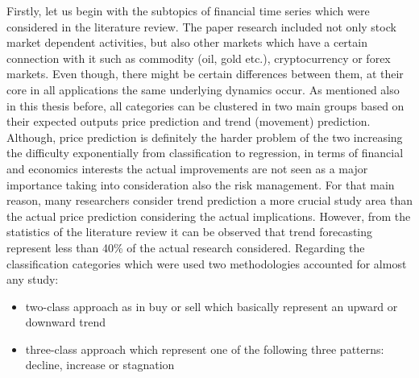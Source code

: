 Firstly, let us begin with the subtopics of financial time series which were considered in the literature review. The paper research included not only stock market dependent activities, but also other markets which have a certain connection with it such as commodity (oil, gold etc.), cryptocurrency or forex markets. Even though, there might be certain differences between them, at their core in all applications the same underlying dynamics occur. As mentioned also in this thesis before, all categories can be clustered in two main groups based on their expected outputs price prediction and trend (movement) prediction. Although, price prediction is definitely the harder problem of the two increasing the difficulty exponentially from classification to regression, in terms of financial and economics interests the actual improvements are not seen as a major importance taking into consideration also the risk management. For that main reason, many researchers consider trend prediction a more crucial study area than the actual price prediction considering the actual implications. However, from the statistics of the literature review \cite{sezer2020financial} it can be observed that trend forecasting represent less than 40\% of the actual research considered. Regarding the classification categories which were used two methodologies accounted for almost any study:
\begin{itemize}
    \item two-class approach as in buy or sell which basically represent an upward or downward trend
    \item three-class approach which represent one of the following three patterns: decline, increase or stagnation
\end{itemize}
